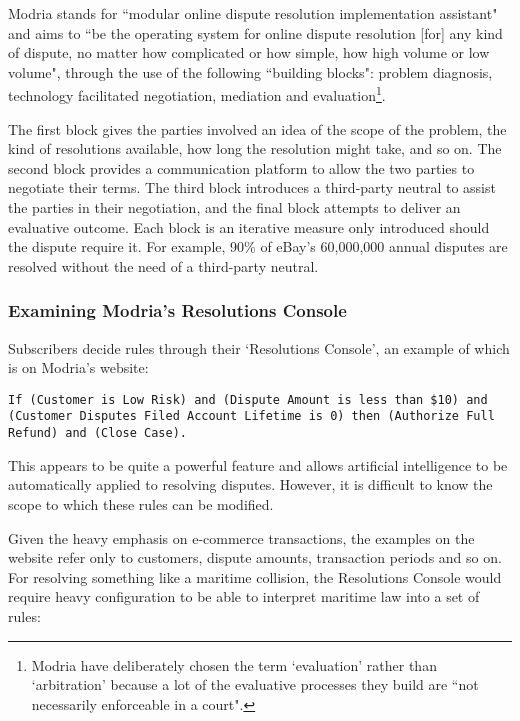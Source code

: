 Modria stands for ``modular online dispute resolution implementation assistant" and aims to ``be the operating system for online dispute resolution [for] any kind of dispute, no matter how complicated or how simple, how high volume or low volume",\cite{modria:interview} through the use of the following ``building blocks": problem diagnosis, technology facilitated negotiation, mediation and evaluation\footnote{Modria have deliberately chosen the term `evaluation' rather than `arbitration' because a lot of the evaluative processes they build are ``not necessarily enforceable in a court".}.

The first block gives the parties involved an idea of the scope of the problem, the kind of resolutions available, how long the resolution might take, and so on. The second block provides a communication platform to allow the two parties to negotiate their terms. The third block introduces a third-party neutral to assist the parties in their negotiation, and the final block attempts to deliver an evaluative outcome. Each block is an iterative measure only introduced should the dispute require it. For example, 90\% of eBay's 60,000,000 annual disputes are resolved without the need of a third-party neutral.

\subsubsection{Examining Modria's Resolutions Console}

Subscribers decide rules through their `Resolutions Console', an example of which is on Modria's website:

\begin{lstlisting}
If (Customer is Low Risk) and (Dispute Amount is less than $10) and (Customer Disputes Filed Account Lifetime is 0) then (Authorize Full Refund) and (Close Case).
\end{lstlisting}

This appears to be quite a powerful feature and allows artificial intelligence to be automatically applied to resolving disputes. However, it is difficult to know the scope to which these rules can be modified.

Given the heavy emphasis on e-commerce transactions, the examples on the website refer only to customers, dispute amounts, transaction periods and so on. For resolving something like a maritime collision, the Resolutions Console would require heavy configuration to be able to interpret maritime law into a set of rules:

